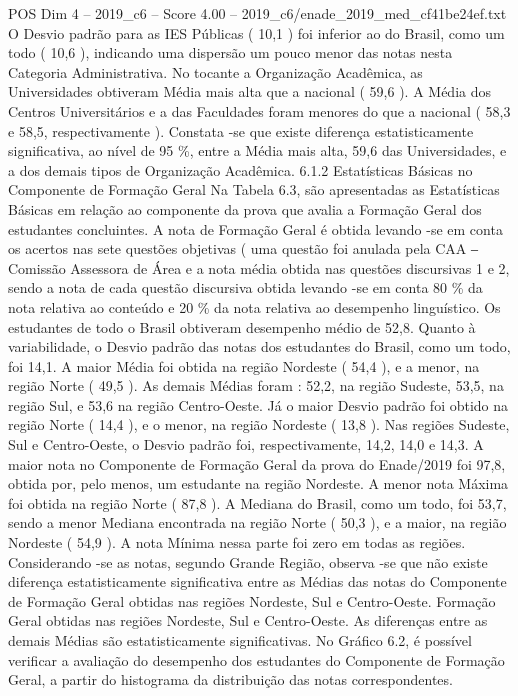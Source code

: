 \begin{textsample}{POS Dim 4 – 2019\_c6 – Score 4.00 – 2019\_c6/enade\_2019\_med\_cf41be24ef.txt}
O Desvio padrão para as IES Públicas ( 10,1 ) foi inferior ao do Brasil, como um todo ( 10,6 ), indicando uma dispersão um pouco menor das notas nesta Categoria Administrativa.
No tocante a Organização Acadêmica, as Universidades obtiveram Média mais alta que a nacional ( 59,6 ).
A Média dos Centros Universitários e a das Faculdades foram menores do que a nacional ( 58,3 e 58,5, respectivamente ).
Constata -se que existe diferença estatisticamente significativa, ao nível de 95 \%, entre a Média mais alta, 59,6 das Universidades, e a dos demais tipos de Organização Acadêmica. 6.1.2 Estatísticas Básicas no Componente de Formação Geral Na Tabela 6.3, são apresentadas as Estatísticas Básicas em relação ao componente da prova que avalia a Formação Geral dos estudantes concluintes.
A nota de Formação Geral é obtida levando -se em conta os acertos nas sete questões objetivas ( uma questão foi anulada pela CAA ‒ Comissão Assessora de Área e a nota média obtida nas questões discursivas 1 e 2, sendo a nota de cada questão discursiva obtida levando -se em conta 80 \% da nota relativa ao conteúdo e 20 \% da nota relativa ao desempenho linguístico.
Os estudantes de todo o Brasil obtiveram desempenho médio de 52,8.
Quanto à variabilidade, o Desvio padrão das notas dos estudantes do Brasil, como um todo, foi 14,1.
A maior Média foi obtida na região Nordeste ( 54,4 ), e a menor, na região Norte ( 49,5 ).
As demais Médias foram : 52,2, na região Sudeste, 53,5, na região Sul, e 53,6 na região Centro-Oeste.
Já o maior Desvio padrão foi obtido na região Norte ( 14,4 ), e o menor, na região Nordeste ( 13,8 ).
Nas regiões Sudeste, Sul e Centro-Oeste, o Desvio padrão foi, respectivamente, 14,2, 14,0 e 14,3.
A maior nota no Componente de Formação Geral da prova do Enade/2019 foi 97,8, obtida por, pelo menos, um estudante na região Nordeste.
A menor nota Máxima foi obtida na região Norte ( 87,8 ).
A Mediana do Brasil, como um todo, foi 53,7, sendo a menor Mediana encontrada na região Norte ( 50,3 ), e a maior, na região Nordeste ( 54,9 ).
A nota Mínima nessa parte foi zero em todas as regiões.
Considerando -se as notas, segundo Grande Região, observa -se que não existe diferença estatisticamente significativa entre as Médias das notas do Componente de Formação Geral obtidas nas regiões Nordeste, Sul e Centro-Oeste.
Formação Geral obtidas nas regiões Nordeste, Sul e Centro-Oeste.
As diferenças entre as demais Médias são estatisticamente significativas.
No Gráfico 6.2, é possível verificar a avaliação do desempenho dos estudantes do Componente de Formação Geral, a partir do histograma da distribuição das notas correspondentes.

\end{textsample}
